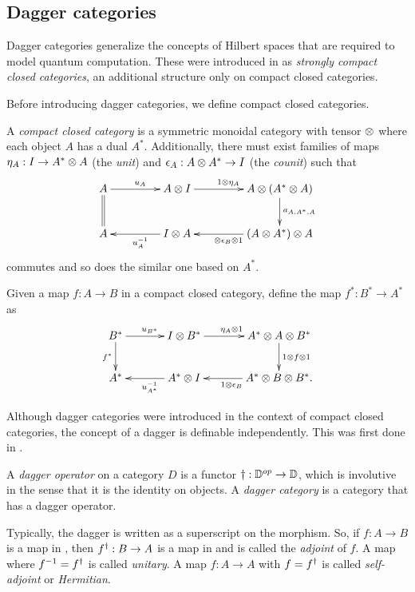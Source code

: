 \subsection{Dagger categories}\label{ssec:daggercategories}
Dagger categories generalize the concepts of Hilbert spaces that are required to model quantum
computation. These were introduced in \cite{abramsky04:catsemquantprot} as \emph{strongly compact
closed categories}, an additional structure only on compact closed categories.

Before introducing dagger categories, we define compact closed
categories.



\begin{definition}\label{def:compactclosedcat}
A \emph{compact closed category} \cD{} is a symmetric monoidal category with tensor $\otimes$ where each
object $A$ has a dual $A^{*}$. Additionally, there must exist families of maps $\eta_{A}: I \to
A^{*} \otimes A$ (the \emph{unit}) and $\epsilon_{A}: A\otimes A^{*}\to I$ (the \emph{counit}) such that
\[
  \xymatrix@C+20pt{
    A \ar[r]^{u_{A}} \ar@{=}[d]  & A\*I \ar[r]^{1\*\eta_{A}}
        & A\* (A^{*}\*A) \ar[d]^{a_{A,A^{*},A}} \\
    A & I\* A \ar[l]^{u_{A}^{-1}} & (A\* A^{*})\*A \ar[l]^{\*\epsilon_{B}\*1}
    }
  \]
commutes and so does the similar one based on $A^{*}$.
\end{definition}

Given a map $f:A\to B$ in a compact closed category,  define the map $f^{*}:B^{*} \to A^{*}$ as
\[
  \xymatrix@C+10pt{
    B^{*}\ar[r]^{u_{B^{*}}} \ar[d]_{f^{*}}& I\*B^{*} \ar[r]^{\eta_{A}\*1}
      & A^{*}\*A\*B^{*}\ar[d]^{1\*f\*1}\\
    A^{*}&    A^{*}\*I\ar[l]^{u_{A^{*}}^{-1}}  &   A^{*}\*B\*B^{*}\ar[l]^{1\*\epsilon_{B}}.
  }
\]

Although dagger categories were introduced in the context of compact closed categories, the concept
of a dagger is definable independently. This was first done in \cite{selinger05:dagger}.

\begin{definition}\label{def:daggercat}
  A \emph{dagger operator} on a category $D$ is a functor $\dagger:\mathbb{D}^{op}\to \mathbb{D}$, which is
  involutive in the sense that it is the identity on objects. A \emph{dagger category} is a category
  that has a dagger operator.
\end{definition}

Typically, the dagger is written as a superscript on the morphism. So, if $f:A\to B$ is a map in
\cD, then ${f}^{\dagger}:B\to A$ is a map in \cD{} and is called the \emph{adjoint} of $f$. A map where
$f^{-1} = {f}^{\dagger}$ is called \emph{unitary}. A map $f:A\to A$ with $f={f}^{\dagger}$ is called
\emph{self-adjoint} or \emph{Hermitian}.

